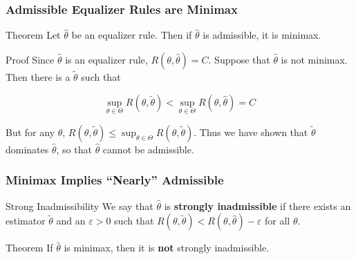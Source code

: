 \begin{frame}
  \frametitle{Admissible Equalizer Rules are Minimax}

  \begin{block}{Theorem}
    Let $\widehat{\theta}$ be an equalizer rule. 
    Then if $\widehat{\theta}$ is admissible, it is minimax.
  \end{block}
  \begin{block}{Proof}
    Since $\widehat{\theta}$ is an equalizer rule, $R(\theta, \widehat{\theta}) = C$.
    Suppose that $\widehat{\theta}$ is not minimax.
    Then there is a $\widetilde{\theta}$ such that

    \[
      \sup_{\theta \in \Theta} R(\theta,\widetilde{\theta}) < \sup_{\theta \in \Theta} R(\theta, \widehat{\theta}) = C
    \]

    But for any $\theta$, $R(\theta, \widetilde{\theta}) \leq \sup_{\theta \in \Theta} R(\theta, \widetilde{\theta})$.
    Thus we have shown that $\widetilde{\theta}$ dominates $\widehat{\theta}$, so that $\widehat{\theta}$ cannot be admissible.
  \end{block}
\end{frame}


\begin{frame}
  \frametitle{Minimax Implies ``Nearly'' Admissible}



  \begin{block}{Strong Inadmissibility}
    We say that $\widehat{\theta}$ is \textbf{strongly inadmissible} if there exists an estimator $\widetilde{\theta}$ and an $\varepsilon > 0$ such that $R(\theta, \widetilde{\theta}) < R(\theta, \widehat{\theta}) - \varepsilon$ for all $\theta$.
  \end{block}

  \begin{block}{Theorem}
    If $\widehat{\theta}$ is minimax, then it is \textbf{not} strongly inadmissible.
  \end{block}

\end{frame}


